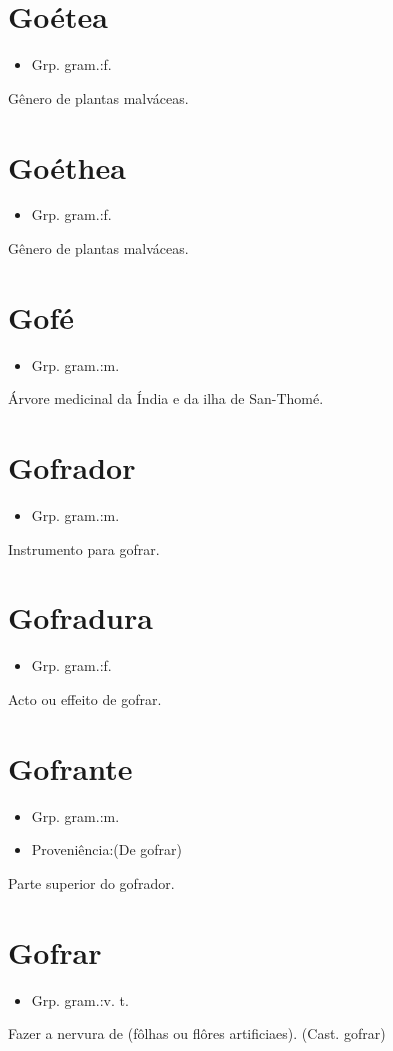 \section{Goétea}
\begin{itemize}
\item {Grp. gram.:f.}
\end{itemize}
Gênero de plantas malváceas.
\section{Goéthea}
\begin{itemize}
\item {Grp. gram.:f.}
\end{itemize}
Gênero de plantas malváceas.
\section{Gofé}
\begin{itemize}
\item {Grp. gram.:m.}
\end{itemize}
Árvore medicinal da Índia e da ilha de San-Thomé.
\section{Gofrador}
\begin{itemize}
\item {Grp. gram.:m.}
\end{itemize}
Instrumento para gofrar.
\section{Gofradura}
\begin{itemize}
\item {Grp. gram.:f.}
\end{itemize}
Acto ou effeito de gofrar.
\section{Gofrante}
\begin{itemize}
\item {Grp. gram.:m.}
\end{itemize}
\begin{itemize}
\item {Proveniência:(De \textunderscore gofrar\textunderscore )}
\end{itemize}
Parte superior do gofrador.
\section{Gofrar}
\begin{itemize}
\item {Grp. gram.:v. t.}
\end{itemize}
Fazer a nervura de (fôlhas ou flôres artificiaes).
(Cast. \textunderscore gofrar\textunderscore )
